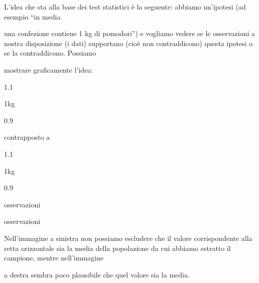 \documentclass[a4paper,portrait,12pt]{article}
\begin{document}
\begin{flushleft}
L'idea che sta alla base dei test statistici \`{e} la seguente: abbiamo un'ipotesi (ad esempio {``}in media
\end{flushleft}


\begin{flushleft}
una confezione contiene 1 kg di pomodori'') e vogliamo vedere se le osservazioni a nostra disposizione (i dati) supportano (cio\`{e} non contraddicono) questa ipotesi o se la contraddicono. Possiamo
\end{flushleft}


\begin{flushleft}
mostrare graficamente l'idea:
\end{flushleft}


1.1


\begin{flushleft}
1kg
\end{flushleft}


0.9





\begin{flushleft}
contrapposto a
\end{flushleft}





1.1


\begin{flushleft}
1kg
\end{flushleft}


0.9





\begin{flushleft}
osservazioni
\end{flushleft}





\begin{flushleft}
osservazioni
\end{flushleft}





\begin{flushleft}
Nell'immagine a sinistra non possiamo escludere che il valore corrispondente alla retta orizzontale sia la media della popolazione da cui abbiamo estratto il campione, mentre nell'immagine
\end{flushleft}


\begin{flushleft}
a destra sembra poco plausibile che quel valore sia la media.
\end{flushleft}
\end{document}
